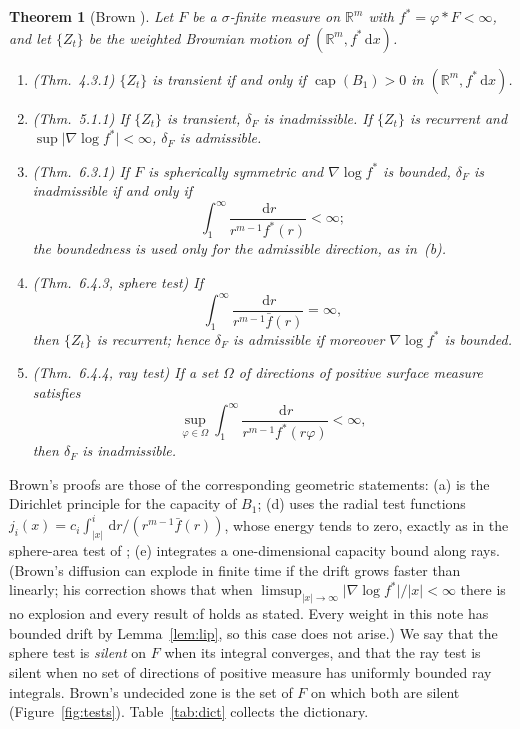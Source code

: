 \documentclass[11pt]{amsart}
\newcommand{\R}{\mathbb{R}}
\newcommand{\dd}{\,\mathrm{d}}
\newcommand{\abs}[1]{\lvert #1\rvert}
\newcommand{\fbar}{\bar f}
\DeclareMathOperator{\capa}{cap}
\theoremstyle{plain}
\newtheorem{theorem}{Theorem}[section]
\theoremstyle{definition}
\theoremstyle{remark}
\begin{document}
\begin{theorem}[Brown \cite{brown1971}]\label{thm:brown}
Let $F$ be a $\sigma$-finite measure on $\R^m$ with $f^*=\varphi*F<\infty$, and
let $\{Z_t\}$ be the weighted Brownian motion of $(\R^m,f^*\dd x)$.
\begin{enumerate}[label=\textup{(\alph*)},leftmargin=2em,itemsep=2pt]
\item \textup{(Thm.~4.3.1)} $\{Z_t\}$ is transient if and only if
$\capa(B_1)>0$ in $(\R^m,f^*\dd x)$.
\item \textup{(Thm.~5.1.1)} If $\{Z_t\}$ is transient, $\delta_F$ is
inadmissible. If $\{Z_t\}$ is recurrent and $\sup\abs{\nabla\log f^*}<\infty$,
$\delta_F$ is admissible.
\item \textup{(Thm.~6.3.1)} If $F$ is spherically symmetric and
$\nabla\log f^*$ is bounded, $\delta_F$ is inadmissible if and only if
\[
\int_1^\infty\frac{\dd r}{r^{m-1}f^*(r)}<\infty ;
\]
the boundedness is used only for the admissible direction, as in~(b).
\item \textup{(Thm.~6.4.3, sphere test)} If
\[
\int_1^\infty\frac{\dd r}{r^{m-1}\fbar(r)}=\infty ,
\]
then $\{Z_t\}$ is recurrent; hence $\delta_F$ is admissible if moreover
$\nabla\log f^*$ is bounded.
\item \textup{(Thm.~6.4.4, ray test)} If a set $\Omega$ of directions of
positive surface measure satisfies
\[
\sup_{\varphi\in\Omega}\int_1^\infty\frac{\dd r}{r^{m-1}f^*(r\varphi)}<\infty ,
\]
then $\delta_F$ is inadmissible.
\end{enumerate}
\end{theorem}

Brown's proofs are those of the corresponding geometric statements: (a) is the
Dirichlet principle for the capacity of $B_1$; (d) uses the radial test
functions $j_i(x)=c_i\int_{\abs x}^{i}\dd r/(r^{m-1}\fbar(r))$, whose energy
tends to zero, exactly as in the sphere-area test of
\cite[Thm.~7.5]{grigoryan1999}; (e) integrates a one-dimensional capacity
bound along rays. (Brown's diffusion can explode in finite time if the drift
grows faster than linearly; his correction \cite{brown1973} shows that when
$\limsup_{\abs x\to\infty}\abs{\nabla\log f^*}/\abs x<\infty$ there is no
explosion and every result of \cite{brown1971} holds as stated. Every weight in
this note has bounded drift by Lemma~\ref{lem:lip}, so this case does not
arise.) We say that the sphere test is \emph{silent} on $F$ when its
integral converges, and that the ray test is silent when no set of directions
of positive measure has uniformly bounded ray integrals. Brown's undecided zone
is the set of $F$ on which both are silent (Figure~\ref{fig:tests}).
Table~\ref{tab:dict} collects the dictionary.
\end{document}
